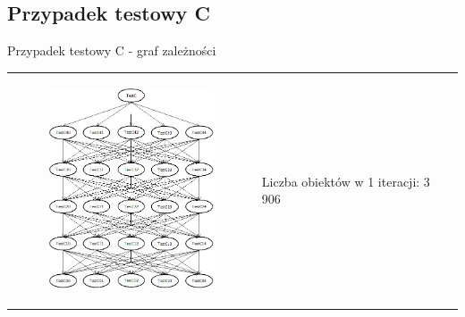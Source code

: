 \documentclass{beamer}
\begin{document}
\subsection*{Przypadek testowy C}

\begin{frame}{Przypadek testowy C - graf zależności}
\begin{table}
     \begin{small}
	\begin{tabular}{ p{7cm} p{2cm} }
	
	\begin{minipage}{.7\textwidth}
\begin{figure}
	\begin{center}
  		\includegraphics[height=6cm]{TestC.png}
	\end{center}
\end{figure}
   	 \end{minipage}
&
	\begin{minipage}{.3\textwidth}
\tiny{Liczba obiektów w 1 iteracji: 3 906}
   	 \end{minipage}

	\end{tabular}
     \end{small}
\end{table}
\end{frame}
\end{document}
